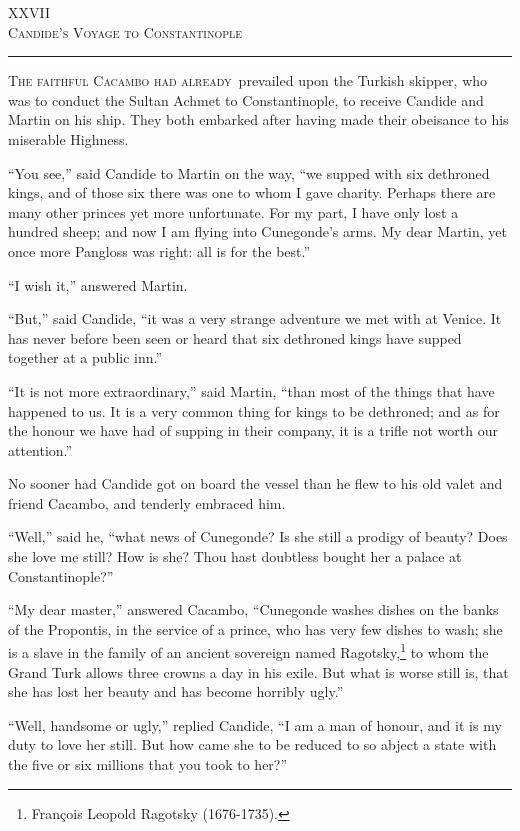 \begin{center}
XXVII\\
\textsc{Candide's Voyage to Constantinople}
\end{center}
\vspace{-0.5cm}
\rule{\textwidth}{0.5pt}
\lettrine{T}{he faithful Cacambo had already}~prevailed upon the Turkish skipper, who was to conduct the Sultan Achmet to Constantinople, to receive Candide and Martin on his ship. They both embarked after having made their obeisance to his miserable Highness.

``You see,'' said Candide to Martin on the way, ``we supped with six dethroned kings, and of those six there was one to whom I gave charity. Perhaps there are many other princes yet more unfortunate. For my part, I have only lost a hundred sheep; and now I am flying into Cunegonde's arms. My dear Martin, yet once more Pangloss was right: all is for the best.''

``I wish it,'' answered Martin.

``But,'' said Candide, ``it was a very strange adventure we met with at Venice. It has never before been seen or heard that six dethroned kings have supped together at a public inn.''

``It is not more extraordinary,'' said Martin, ``than most of the things that have happened to us. It is a very common thing for kings to be dethroned; and as for the honour we have had of supping in their company, it is a trifle not worth our attention.''

No sooner had Candide got on board the vessel than he flew to his old valet and friend Cacambo, and tenderly embraced him.

``Well,'' said he, ``what news of Cunegonde? Is she still a prodigy of beauty? Does she love me still? How is she? Thou hast doubtless bought her a palace at Constantinople?''

``My dear master,'' answered Cacambo, ``Cunegonde washes dishes on the banks of the Propontis, in the service of a prince, who has very few dishes to wash; she is a slave in the family of an ancient sovereign named Ragotsky,\footnote{François Leopold Ragotsky (1676-1735).} to whom the Grand Turk allows three crowns a day in his exile. But what is worse still is, that she has lost her beauty and has become horribly ugly.''

``Well, handsome or ugly,'' replied Candide, ``I am a man of honour, and it is my duty to love her still. But how came she to be reduced to so abject a state with the five or six millions that you took to her?''

